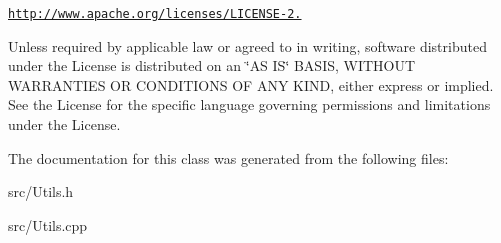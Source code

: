 \href{http://www.apache.org/licenses/LICENSE-2.0}{\tt http\+://www.\+apache.\+org/licenses/\+L\+I\+C\+E\+N\+S\+E-\/2.}

Unless required by applicable law or agreed to in writing, software distributed under the License is distributed on an \char`\"{}\+A\+S I\+S\char`\"{} B\+A\+S\+IS, W\+I\+T\+H\+O\+UT W\+A\+R\+R\+A\+N\+T\+I\+ES OR C\+O\+N\+D\+I\+T\+I\+O\+NS OF A\+NY K\+I\+ND, either express or implied. See the License for the specific language governing permissions and limitations under the License. 

The documentation for this class was generated from the following files\+:\begin{DoxyCompactItemize}
\item 
src/Utils.\+h\item 
src/Utils.\+cpp\end{DoxyCompactItemize}
